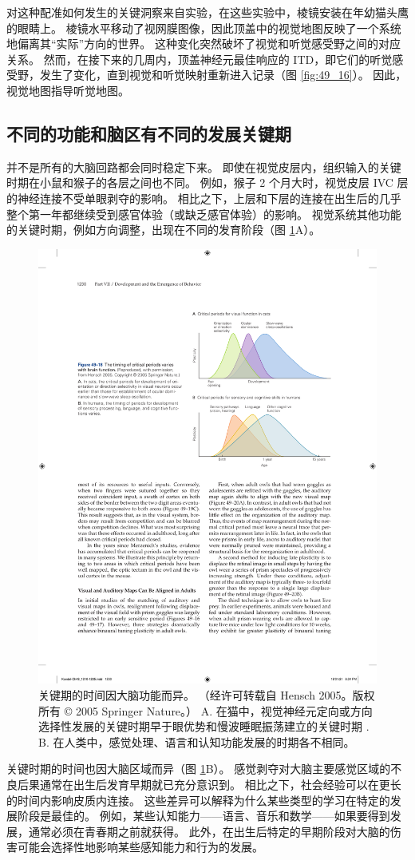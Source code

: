 对这种配准如何发生的关键洞察来自实验，在这些实验中，棱镜安装在年幼猫头鹰的眼睛上。
棱镜水平移动了视网膜图像，因此顶盖中的视觉地图反映了一个系统地偏离其“实际”方向的世界。
这种变化突然破坏了视觉和听觉感受野之间的对应关系。
然而，在接下来的几周内，顶盖神经元最佳响应的 ITD，即它们的听觉感受野，发生了变化，直到视觉和听觉映射重新进入记录（图 \ref{fig:49_16}）。
因此，视觉地图指导听觉地图。



\subsection{不同的功能和脑区有不同的发展关键期}

并不是所有的大脑回路都会同时稳定下来。
即使在视觉皮层内，组织输入的关键时期在小鼠和猴子的各层之间也不同。
例如，猴子 2 个月大时，视觉皮层 IVC 层的神经连接不受单眼剥夺的影响。
相比之下，上层和下层的连接在出生后的几乎整个第一年都继续受到感官体验（或缺乏感官体验）的影响。
视觉系统其他功能的关键时期，例如方向调整，出现在不同的发育阶段（图 \ref{fig:49_18}A）。


\begin{figure}[htbp]
	\centering
	\includegraphics[width=0.6\linewidth]{chap49/fig_49_18}
	\caption{关键期的时间因大脑功能而异。 （经许可转载自 Hensch 2005。版权所有 © 2005 Springer Nature。） A. 在猫中，视觉神经元定向或方向选择性发展的关键时期早于眼优势和慢波睡眠振荡建立的关键时期 . B. 在人类中，感觉处理、语言和认知功能发展的时期各不相同。}
	\label{fig:49_18}
\end{figure}


关键时期的时间也因大脑区域而异（图 \ref{fig:49_18}B）。
感觉剥夺对大脑主要感觉区域的不良后果通常在出生后发育早期就已充分意识到。
相比之下，社会经验可以在更长的时间内影响皮质内连接。
这些差异可以解释为什么某些类型的学习在特定的发展阶段是最佳的。
例如，某些认知能力——语言、音乐和数学——如果要得到发展，通常必须在青春期之前就获得。
此外，在出生后特定的早期阶段对大脑的伤害可能会选择性地影响某些感知能力和行为的发展。



